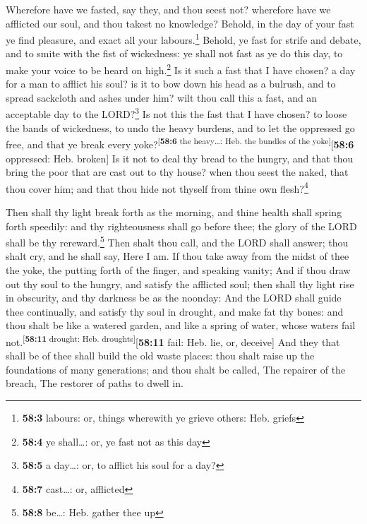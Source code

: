  Wherefore have we fasted, say they, and thou seest not?
wherefore have we afflicted our soul, and thou takest no knowledge?
Behold, in the day of your fast ye find pleasure, and exact all your
labours.\footnote{\textbf{58:3} labours: or, things wherewith ye grieve
  others: Heb. griefs}  Behold, ye fast for strife and
debate, and to smite with the fist of wickedness: ye shall not fast as
ye do this day, to make your voice to be heard on high.\footnote{\textbf{58:4}
  ye shall\ldots: or, ye fast not as this day}  Is it such
a fast that I have chosen? a day for a man to afflict his soul? is it to
bow down his head as a bulrush, and to spread sackcloth and ashes under
him? wilt thou call this a fast, and an acceptable day to the
LORD?\footnote{\textbf{58:5} a day\ldots: or, to afflict his soul for a
  day?}  Is not this the fast that I have chosen? to loose
the bands of wickedness, to undo the heavy burdens, and to let the
oppressed go free, and that ye break every
yoke?\textsuperscript{{[}\textbf{58:6} the heavy\ldots: Heb. the bundles
of the yoke{]}}{[}\textbf{58:6} oppressed: Heb. broken{]} 
Is it not to deal thy bread to the hungry, and that thou bring the poor
that are cast out to thy house? when thou seest the naked, that thou
cover him; and that thou hide not thyself from thine own
flesh?\footnote{\textbf{58:7} cast\ldots: or, afflicted}

 Then shall thy light break forth as the morning, and
thine health shall spring forth speedily: and thy righteousness shall go
before thee; the glory of the LORD shall be thy rereward.\footnote{\textbf{58:8}
  be\ldots: Heb. gather thee up}  Then shalt thou call,
and the LORD shall answer; thou shalt cry, and he shall say, Here I am.
If thou take away from the midst of thee the yoke, the putting forth of
the finger, and speaking vanity;  And if thou draw out
thy soul to the hungry, and satisfy the afflicted soul; then shall thy
light rise in obscurity, and thy darkness be as the noonday:
 And the LORD shall guide thee continually, and satisfy
thy soul in drought, and make fat thy bones: and thou shalt be like a
watered garden, and like a spring of water, whose waters fail
not.\textsuperscript{{[}\textbf{58:11} drought: Heb.
droughts{]}}{[}\textbf{58:11} fail: Heb. lie, or, deceive{]}
 And they that shall be of thee shall build the old waste
places: thou shalt raise up the foundations of many generations; and
thou shalt be called, The repairer of the breach, The restorer of paths
to dwell in.

